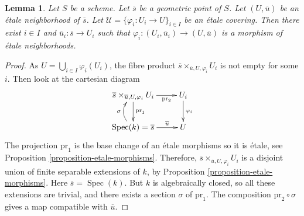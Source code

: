 \documentclass[10pt,a4paper]{amsart}
\theoremstyle{plain}
\newtheorem{lemma}[subsection]{Lemma}
\theoremstyle{definition}
\theoremstyle{remark}
\numberwithin{equation}{subsection}
\def\Spec{\mathop{\mathrm{Spec}}}
\begin{document}
\begin{lemma}
\label{lemma-geometric-lift-to-cover}
Let $S$ be a scheme.
Let $\overline{s}$ be a geometric point of $S$.
Let $(U, \overline{u})$ be an \'etale neighborhood of $\overline{s}$.
Let $\mathcal{U} = \{\varphi_i : U_i \to U \}_{i\in I}$ be an \'etale covering.
Then there exist $i \in I$ and $\overline{u}_i : \overline{s} \to U_i$
such that $\varphi_i : (U_i, \overline{u}_i) \to (U, \overline{u})$
is a morphism of \'etale neighborhoods.
\end{lemma}

\begin{proof}
As $U = \bigcup_{i\in I} \varphi_i(U_i)$, the fibre product
$\overline{s} \times_{\overline{u}, U, \varphi_i} U_i$ is not empty
for some $i$. Then look at the cartesian diagram
$$
\xymatrix{
\overline{s} \times_{\overline{u}, U, \varphi_i} U_i
\ar[d]^{\text{pr}_1} \ar[r]_-{\text{pr}_2} & U_i
\ar[d]^{\varphi_i} \\
\Spec(k) = \overline{s} \ar@/^1pc/[u]^\sigma
\ar[r]^-{\overline{u}} & U
}
$$
The projection $\text{pr}_1$ is the base change of an \'etale morphisms so it
is \'etale, see
Proposition \ref{proposition-etale-morphisms}.
Therefore, $\overline{s} \times_{\overline{u}, U, \varphi_i} U_i$
is a disjoint union of finite separable extensions of $k$, by
Proposition \ref{proposition-etale-morphisms}. Here
$\overline{s} = \Spec(k)$. But $k$ is algebraically closed, so all
these extensions are trivial, and there exists a section $\sigma$ of
$\text{pr}_1$. The composition
$\text{pr}_2 \circ \sigma$ gives a map compatible with $\overline{u}$.
\end{proof}
\end{document}
